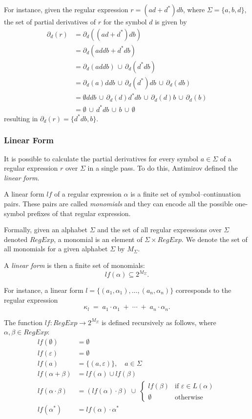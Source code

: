 For instance, given the regular expression $r = (ad + d^*)db$, where $\Sigma = \{a,b,d\}$, the set of partial derivatives of $r$ for the symbol $d$ is given by
\begin{align*}
	\partial_d(r) &= \partial_d((ad + d^*)db) \\
	&= \partial_d(addb + d^*db) \\
	&= \partial_d(addb) \, \cup \, \partial_d(d^*db) \\
	&= \partial_d(a)ddb \, \cup \, \partial_d(d^*)db \, \cup \, \partial_d(db) \\
	&= \emptyset ddb \, \cup \, \partial_d(d)d^*db \, \cup \, \partial_d(d)b \, \cup \, \partial_d(b) \\
	&= \emptyset \, \cup \, d^*db \, \cup \, b \, \cup \, \emptyset
\end{align*}
resulting in $\partial_d(r) = \{d^*db, b\}$.

\subsubsection{Linear Form}
It is possible to calculate the partial derivatives for every symbol $a \in \Sigma$ of a regular expression $r$ over $\Sigma$ in a single pass. To do this, Antimirov \cite{pdregex_antimirov} defined the \emph{linear form}.

A linear form $lf$ of a regular expression $\alpha$ is a finite set of symbol–continuation pairs.  
These pairs are called \textit{monomials} and they can encode all the possible one-symbol prefixes of that regular expression.

Formally, given an alphabet $\Sigma$ and the set of all regular expressions over $\Sigma$ denoted $RegExp$, a monomial is an element of $\Sigma \times RegExp$.
We denote the set of all monomials for a given alphabet $\Sigma$ by $M_\Sigma$.
  
A \emph{linear form} is then a finite set of monomials:
\[
lf(\alpha) \subseteq {2}^{M_\Sigma}.
\]

For instance, a linear form $l = \{(a_1,\alpha_1), \ldots, (a_n,\alpha_n)\}$ corresponds to the regular expression
\[
\kappa_l \;=\; a_1\cdot\alpha_1 \;+\; \cdots \;+\; a_n\cdot\alpha_n.
\]

The function $lf : RegExp \to {2}^{M_\Sigma}$ is defined recursively as follows, where $\alpha,\beta \in RegExp$:
\begin{align*}
	lf(\emptyset) &= \emptyset \\
	lf(\varepsilon) &= \emptyset \\
	lf(a) &= \{(a,\varepsilon)\}, \quad a\in \Sigma \\[4pt]
	lf(\alpha+\beta) &= lf(\alpha) \cup lf(\beta) \\
	lf(\alpha\cdot\beta) &= (lf(\alpha)\cdot \beta) \;\cup\; \begin{cases}
		lf(\beta) & \text{if } \varepsilon \in L(\alpha) \\
		\emptyset & \text{otherwise}
	\end{cases} \\
	lf(\alpha^\ast) &= lf(\alpha)\cdot \alpha^\ast
\end{align*}



